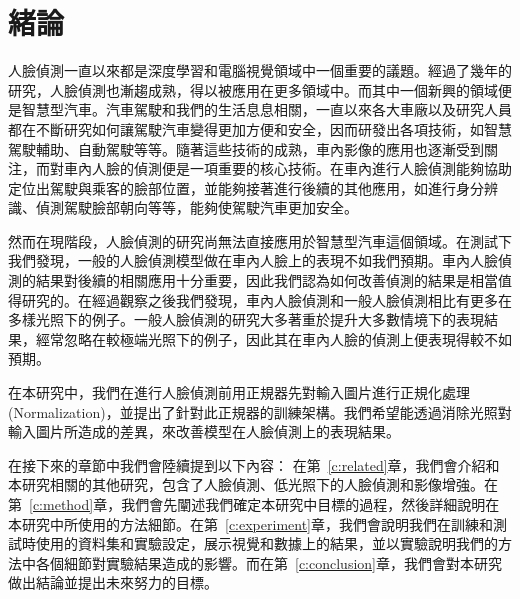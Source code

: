 \chapter{緒論}
\label{c:intro}

人臉偵測一直以來都是深度學習和電腦視覺領域中一個重要的議題。經過了幾年的研究，人臉偵測也漸趨成熟，得以被應用在更多領域中。而其中一個新興的領域便是智慧型汽車。汽車駕駛和我們的生活息息相關，一直以來各大車廠以及研究人員都在不斷研究如何讓駕駛汽車變得更加方便和安全，因而研發出各項技術，如智慧駕駛輔助、自動駕駛等等。隨著這些技術的成熟，車內影像的應用也逐漸受到關注，而對車內人臉的偵測便是一項重要的核心技術。在車內進行人臉偵測能夠協助定位出駕駛與乘客的臉部位置，並能夠接著進行後續的其他應用，如進行身分辨識、偵測駕駛臉部朝向等等，能夠使駕駛汽車更加安全。

然而在現階段，人臉偵測的研究尚無法直接應用於智慧型汽車這個領域。在測試下我們發現，一般的人臉偵測模型做在車內人臉上的表現不如我們預期。車內人臉偵測的結果對後續的相關應用十分重要，因此我們認為如何改善偵測的結果是相當值得研究的。在經過觀察之後我們發現，車內人臉偵測和一般人臉偵測相比有更多在多樣光照下的例子。一般人臉偵測的研究大多著重於提升大多數情境下的表現結果，經常忽略在較極端光照下的例子，因此其在車內人臉的偵測上便表現得較不如預期。

在本研究中，我們在進行人臉偵測前用正規器先對輸入圖片進行正規化處理 (Normalization)，並提出了針對此正規器的訓練架構。我們希望能透過消除光照對輸入圖片所造成的差異，來改善模型在人臉偵測上的表現結果。

在接下來的章節中我們會陸續提到以下內容：
在第~\ref{c:related}章，我們會介紹和本研究相關的其他研究，包含了人臉偵測、低光照下的人臉偵測和影像增強。在第~\ref{c:method}章，我們會先闡述我們確定本研究中目標的過程，然後詳細說明在本研究中所使用的方法細節。在第~\ref{c:experiment}章，我們會說明我們在訓練和測試時使用的資料集和實驗設定，展示視覺和數據上的結果，並以實驗說明我們的方法中各個細節對實驗結果造成的影響。而在第~\ref{c:conclusion}章，我們會對本研究做出結論並提出未來努力的目標。
